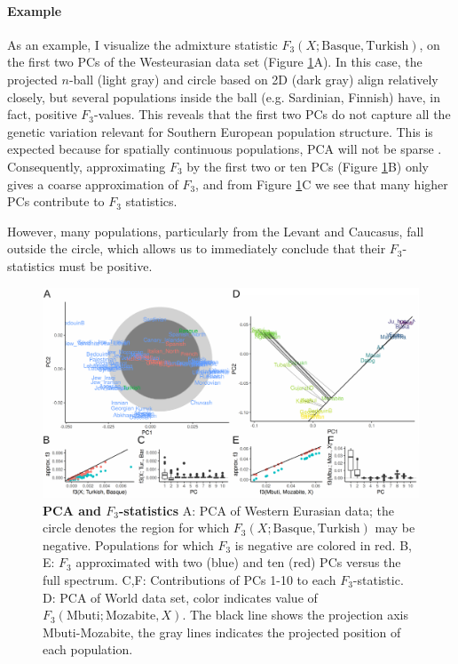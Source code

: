 \documentclass[12pt,fullpage, a4paper]{article}
\begin{document}
\paragraph{Example}
As an example, I visualize the admixture statistic $F_3(X; \text{Basque}, \text{Turkish})$, on the first two PCs of the Westeurasian data set (Figure \ref{fig:f3}A). In this case, the projected $n$-ball (light gray) and circle based on 2D (dark gray) align relatively closely, but several populations inside the ball (e.g. Sardinian, Finnish) have, in fact, positive $F_3$-values. This reveals that the first two PCs do not capture all the genetic variation relevant for Southern European population structure. This is expected because for spatially continuous populations, PCA will not be sparse \citep{novembre2008a}.  Consequently, approximating $F_3$ by the first two or ten PCs (Figure \ref{fig:f3}B) only gives a coarse approximation of $F_3$, and from Figure \ref{fig:f3}C we see that many higher PCs contribute to $F_3$ statistics.

However, many populations, particularly from the Levant and Caucasus, fall outside the circle, which allows us to immediately conclude that their $F_3$-statistics must be positive.


\begin{figure}[!ht]
	\includegraphics[width=\textwidth]{figures/fig_f3_data.pdf}
	\caption{\textbf{PCA and $F_3$-statistics} A: PCA of Western Eurasian data; the circle denotes the region for which $F_3(X; \text{Basque}, \text{Turkish})$ may be negative. Populations for which $F_3$ is negative are colored in red. B, E: $F_3$ approximated with two (blue) and ten (red) PCs versus the full spectrum. C,F: Contributions of PCs 1-10 to each $F_3$-statistic. D: PCA of World data set, color indicates value of $F_3(\text{Mbuti}; \text{Mozabite}, X)$. The black line shows the projection axis Mbuti-Mozabite, the gray lines indicates the projected position of each population. }
	\label{fig:f3}
\end{figure}
\end{document}
